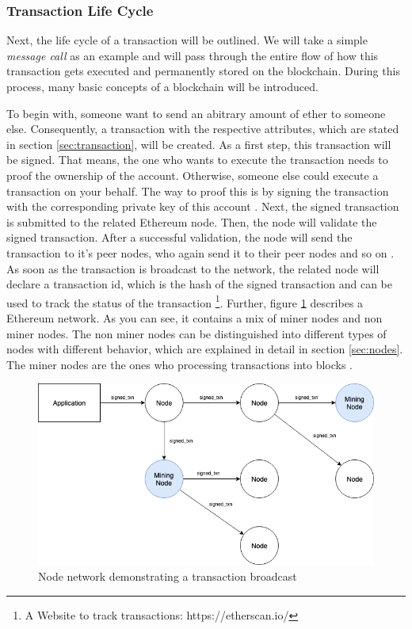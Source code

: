 \subsubsection{Transaction Life Cycle}
\label{sec:transaction_lifecycle}
Next, the life cycle of a transaction will be outlined. We will take a simple \textit{message call} as an example and will pass through the entire flow of how this transaction gets executed and permanently stored on the blockchain. During this process, many basic concepts of a blockchain will be introduced. 

To begin with, someone want to send an abitrary amount of ether to someone else. Consequently, a transaction with the respective attributes, which are stated in section \ref{sec:transaction}, will be created. As a first step, this transaction will be signed. That means, the one who wants to execute the transaction needs to proof the ownership of the account. Otherwise, someone else could execute a transaction on your behalf. The way to proof this is by signing the transaction with the corresponding private key of this account . 
Next, the signed transaction is submitted to the related Ethereum node. Then, the node will validate the signed transaction. After a successful validation, the node will send the transaction to it's peer nodes, who again send it to their peer nodes and so on . As soon as the transaction is broadcast to the network, the related node will declare a transaction id, which is the hash of the signed transaction and can be used to track the status of the transaction \footnote{A Website to track transactions: https://etherscan.io/}. Further, figure \ref{figure:node_network} describes a Ethereum network. As you can see, it contains a mix of miner nodes and non miner nodes. The non miner nodes can be distinguished into different types of nodes with different behavior, which are explained in detail in section \ref{sec:nodes}. The miner nodes are the ones who processing transactions into blocks . 

\begin{figure}[htbp]
	\centering
	\includegraphics[width=.9\linewidth]{./figures/node_network.png}
	\caption{Node network demonstrating a transaction broadcast}
	\label{figure:node_network}
\end{figure}


